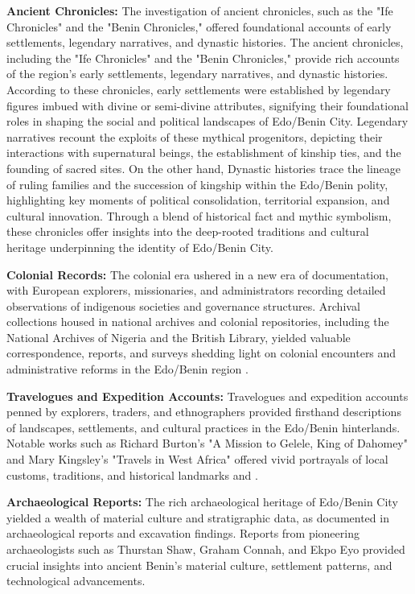 \vspace{0.5cm} 
\textbf{Ancient Chronicles:} The investigation of ancient chronicles, such as the "Ife Chronicles" and the "Benin Chronicles," offered foundational accounts of early settlements, legendary narratives, and dynastic histories\cite{otterbein1966}. The ancient chronicles, including the "Ife Chronicles" and the "Benin Chronicles," provide rich accounts of the region's early settlements, legendary narratives, and dynastic histories. According to these chronicles, early settlements were established by legendary figures imbued with divine or semi-divine attributes, signifying their foundational roles in shaping the social and political landscapes of Edo/Benin City. Legendary narratives recount the exploits of these mythical progenitors, depicting their interactions with supernatural beings, the establishment of kinship ties, and the founding of sacred sites. On the other hand, Dynastic histories trace the lineage of ruling families and the succession of kingship within the Edo/Benin polity, highlighting key moments of political consolidation, territorial expansion, and cultural innovation. Through a blend of historical fact and mythic symbolism, these chronicles offer insights into the deep-rooted traditions and cultural heritage underpinning the identity of Edo/Benin City.

\textbf{Colonial Records:} The colonial era ushered in a new era of documentation, with European explorers, missionaries, and administrators recording detailed observations of indigenous societies and governance structures. Archival collections housed in national archives and colonial repositories, including the National Archives of Nigeria and the British Library, yielded valuable correspondence, reports, and surveys shedding light on colonial encounters and administrative reforms in the Edo/Benin region \cite{oliver1985}.

\textbf{Travelogues and Expedition Accounts:} Travelogues and expedition accounts penned by explorers, traders, and ethnographers provided firsthand descriptions of landscapes, settlements, and cultural practices in the Edo/Benin hinterlands. Notable works such as Richard Burton's "A Mission to Gelele, King of Dahomey" and Mary Kingsley's "Travels in West Africa" offered vivid portrayals of local customs, traditions, and historical landmarks\cite{burton2011} and \cite{kingsley1988}.

\textbf{Archaeological Reports:} The rich archaeological heritage of Edo/Benin City yielded a wealth of material culture and stratigraphic data, as documented in archaeological reports and excavation findings. Reports from pioneering archaeologists such as Thurstan Shaw, Graham Connah, and Ekpo Eyo provided crucial insights into ancient Benin's material culture, settlement patterns, and technological advancements\cite{shaw1970,connah1975}.

